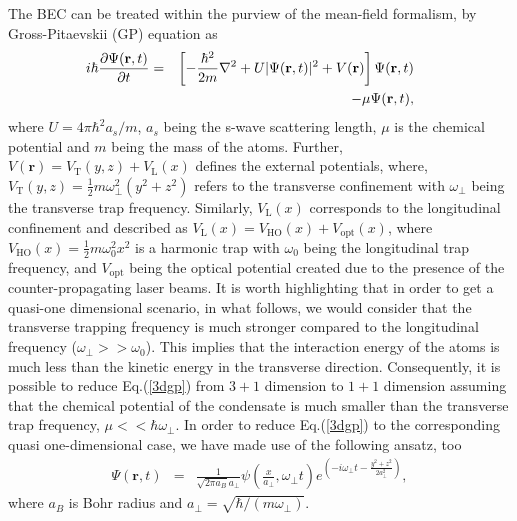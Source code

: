 \documentclass[epj]{svjour}
\begin{document}
The BEC can be treated within the purview of the mean-field formalism, by Gross-Pitaevskii (GP) equation \cite{gross,pitae} as
\begin{eqnarray}
\hskip-0.5cm
i\hbar\frac{\partial\Psi(\mathbf{r},t)}{\partial t} &=& \left[-\frac{\hbar^2}{2m}\nabla^2+U|\Psi(\mathbf{r},t)|^2 + V(\mathbf{r}) \right] \Psi(\mathbf{r},t) \nonumber \\ & &  - \mu \Psi(\mathbf{r},t) ,\label{3dgp}
\end{eqnarray}
where $U=4\pi\hbar^2a_s/m$, $a_s$ being the s-wave scattering length, $\mu$ is the chemical potential and $m$ being the mass of the atoms. Further, $V(\mathbf{r}) = V_{\mathrm{T}}(y,z) + V_{\mathrm{L}}(x)$ defines the external potentials, where, $V_{\mathrm{T}}(y,z)=\frac{1}{2} m \omega_{\perp}^2(y^2+z^2)$ refers to the transverse confinement with $\omega_{\perp}$ being the transverse trap frequency. Similarly, $V_{\mathrm{L}}(x)$ corresponds to the longitudinal confinement and described as $V_{\mathrm{L}}(x) = V_{\mathrm{HO}}(x) + V_{\mathrm{opt}}(x)$, where  $V_{\mathrm{HO}}(x)=\frac{1}{2} m \omega_{0}^2 x^2$ is a harmonic trap with $\omega_{0}$ being the longitudinal trap frequency, and $V_{\mathrm{opt}}$ being the optical potential created due to the presence of the counter-propagating laser beams. It is worth highlighting that in order to get a quasi-one dimensional scenario, in what follows, we would consider that the transverse trapping frequency is much stronger compared to the longitudinal frequency ($\omega_{\perp} >> \omega_{0}$). This implies that the interaction energy of the atoms is much less than the kinetic energy in the transverse direction.  Consequently,  it is possible to reduce Eq.(\ref{3dgp}) from $3+1$ dimension to $1+1$ dimension assuming that the chemical potential of the condensate is much smaller than the transverse trap frequency, $\mu<<\hbar\omega_{\perp}$. In order to reduce Eq.(\ref{3dgp}) to  the corresponding quasi one-dimensional case, we have made use of the following ansatz, too
\begin{eqnarray}
\Psi(\mathbf{r}, t) &=& \frac{1}{\sqrt{2\pi a_B}a_{\perp}}\psi\left(\frac{x}{a_{\perp}},\omega_{\perp}t\right) e^{\left(-i\omega_{\perp}t-\frac{y^2+z^2}{2a_{\perp}^2}\right)},\label{ansatz}
\end{eqnarray}
where $a_B$ is Bohr radius and $a_{\perp}=\sqrt{\hbar/(m\omega_{\perp})}$.
\end{document}
